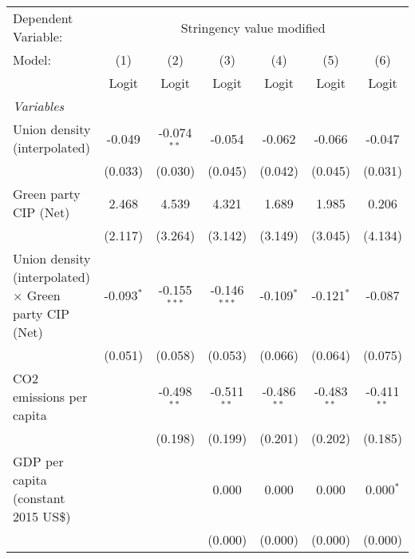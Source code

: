 
\begingroup
\centering
\begin{tabular}{lcccccc}
   \toprule
   Dependent Variable: & \multicolumn{6}{c}{Stringency value modified}\\
   Model:                                                       & (1)          & (2)            & (3)            & (4)           & (5)           & (6)\\  
                                                                &  Logit       & Logit          & Logit          & Logit         & Logit         & Logit\\  
   \midrule
   \emph{Variables}\\
   Union density (interpolated)                                 & -0.049       & -0.074$^{**}$  & -0.054         & -0.062        & -0.066        & -0.047\\   
                                                                & (0.033)      & (0.030)        & (0.045)        & (0.042)       & (0.045)       & (0.031)\\   
   Green party CIP (Net)                                        & 2.468        & 4.539          & 4.321          & 1.689         & 1.985         & 0.206\\   
                                                                & (2.117)      & (3.264)        & (3.142)        & (3.149)       & (3.045)       & (4.134)\\   
   Union density (interpolated) $\times$ Green party CIP (Net)  & -0.093$^{*}$ & -0.155$^{***}$ & -0.146$^{***}$ & -0.109$^{*}$  & -0.121$^{*}$  & -0.087\\   
                                                                & (0.051)      & (0.058)        & (0.053)        & (0.066)       & (0.064)       & (0.075)\\   
   CO2 emissions per capita                                     &              & -0.498$^{**}$  & -0.511$^{**}$  & -0.486$^{**}$ & -0.483$^{**}$ & -0.411$^{**}$\\   
                                                                &              & (0.198)        & (0.199)        & (0.201)       & (0.202)       & (0.185)\\   
   GDP per capita (constant 2015 US\$)                          &              &                & 0.000          & 0.000         & 0.000         & 0.000$^{*}$\\   
                                                                &              &                & (0.000)        & (0.000)       & (0.000)       & (0.000)\\   

\end{tabular}
